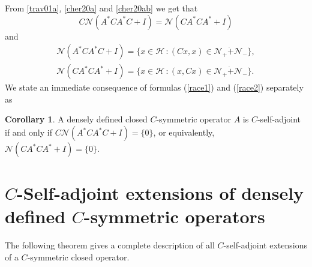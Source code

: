 \documentclass[12pt]{amsart}
\theoremstyle{definition}
\newtheorem{cor}[thm]{Corollary}
\newcommand{\cH}{\mathcal{H}\,}
\newcommand{\cN}{\mathcal{N}}
\begin{document}
From \eqref{trav01a}, \eqref{cher20a} and \eqref{cher20ab} we get that
$$C \cN(A^*CA^*C+I)=\cN(CA^*CA^*+I)$$
and
\[
\begin{array}{l} %
\cN(A^*CA^*C+I)=\{x\in \cH: (Cx,x)\in \cN_+\dot+\cN_-  \},\\
 \cN(CA^*CA^*+I)=\{x\in \cH: (x,Cx)\in \cN_+\dot+\cN_-  \}.
\end{array}
\] %
We state an immediate consequence of formulas (\ref{race1}) and (\ref{race2}) separately as
\begin{cor}
A densely defined closed $C$-symmetric operator $A$ is $C$-self-adjoint if and only if  $C \cN(A^*CA^*C+I)=\{0\}$, or  equivalently, $\cN(CA^*CA^*+I)=\{0\}$.
\end{cor}
\section{$C$-Self-adjoint extensions of densely defined $C$-symmetric operators}\label{extensions}

The following theorem  gives a complete description of all $C$-self-adjoint extensions of a $C$-symmetric closed operator.
\end{document}
